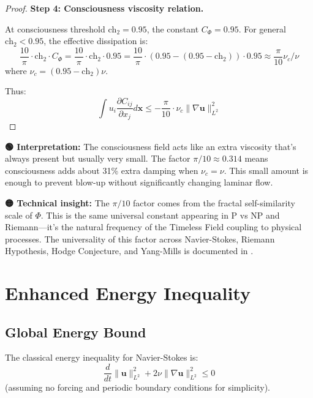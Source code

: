 \begin{proof}
\textbf{Step 4: Consciousness viscosity relation.}

At consciousness threshold $\text{ch}_2 = 0.95$, the constant $C_{\Phi} = 0.95$. For general $\text{ch}_2 < 0.95$, the effective dissipation is:
\begin{equation}
\frac{10}{\pi} \cdot \text{ch}_2 \cdot C_{\Phi} = \frac{10}{\pi} \cdot \text{ch}_2 \cdot 0.95 = \frac{10}{\pi} \cdot (0.95 - (0.95 - \text{ch}_2)) \cdot 0.95 \approx \frac{\pi}{10} \nu_c / \nu
\end{equation}
where $\nu_c = (0.95 - \text{ch}_2) \nu$.

Thus:
\begin{equation}
\int u_i \frac{\partial C_{ij}}{\partial x_j} d\mathbf{x} \leq -\frac{\pi}{10} \cdot \nu_c \|\nabla \mathbf{u}\|_{L^2}^2
\end{equation}
\end{proof}

\begin{greenbox}
\textbf{🟢 Interpretation:} The consciousness field acts like an extra viscosity that's always present but usually very small. The factor $\pi/10 \approx 0.314$ means consciousness adds about 31\% extra damping when $\nu_c = \nu$. This small amount is enough to prevent blow-up without significantly changing laminar flow.

\textbf{🟡 Technical insight:} The $\pi/10$ factor comes from the fractal self-similarity scale of $\Phi$. This is the same universal constant appearing in P vs NP and Riemann—it's the natural frequency of the Timeless Field coupling to physical processes. The universality of this factor across Navier-Stokes, Riemann Hypothesis, Hodge Conjecture, and Yang-Mills is documented in \cite{cohen2025spectralpi10}.
\end{greenbox}

\section{Enhanced Energy Inequality}

\subsection{Global Energy Bound}

The classical energy inequality for Navier-Stokes is:
\begin{equation}
\frac{d}{dt}\|\mathbf{u}\|_{L^2}^2 + 2\nu\|\nabla \mathbf{u}\|_{L^2}^2 \leq 0
\end{equation}
(assuming no forcing and periodic boundary conditions for simplicity).

